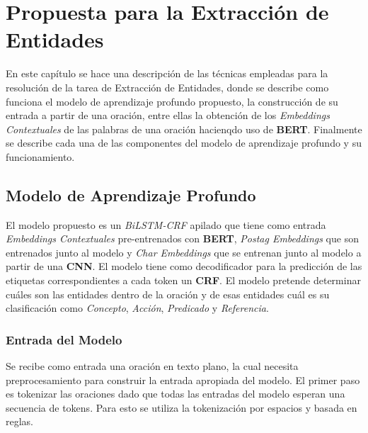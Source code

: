 \chapter{Propuesta para la Extracción de Entidades}\label{chapter:entities}


En este capítulo se hace una descripción de las técnicas empleadas para la resolución de la tarea de Extracción de Entidades, donde se describe como funciona el modelo de aprendizaje profundo propuesto, la construcci\'on de su entrada a partir de una oraci\'on, entre ellas la obtenci\'on de los \emph{Embeddings Contextuales} de las palabras de una oraci\'on hacienqdo uso de \textbf{BERT}. Finalmente se describe cada una de las componentes del modelo de aprendizaje profundo y su funcionamiento.


\section{Modelo de Aprendizaje Profundo}

El modelo propuesto es un \emph{BiLSTM-CRF} apilado que tiene como entrada \emph{Embeddings Contextuales} pre-entrenados con \textbf{BERT}, \emph{Postag Embeddings} que son entrenados junto al modelo y \emph{Char Embeddings} que se entrenan junto al modelo a partir de una \textbf{CNN}. El modelo tiene como decodificador para la predicci\'on de las etiquetas correspondientes a cada token un \textbf{CRF}. El modelo pretende determinar cu\'ales son las entidades dentro de la oraci\'on y de esas entidades cu\'al es su clasificaci\'on como \emph{Concepto}, \emph{Acci\'on}, \emph{Predicado} y \emph{Referencia}.

\subsection{Entrada del Modelo}\label{sec:entrance}
Se recibe como entrada una oraci\'on en texto plano, la cual necesita preprocesamiento para construir la entrada apropiada del modelo. El primer paso es tokenizar las oraciones dado que todas las entradas del modelo esperan una secuencia de tokens. Para esto se utiliza la tokenizaci\'on por espacios y basada en reglas.

